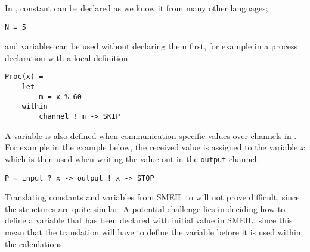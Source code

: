 In \cspm, constant can be declared as we know it from many other languages;
\begin{verbatim}
N = 5
\end{verbatim}
and variables can be used without declaring them first, for example in a process declaration with a local definition.
\begin{verbatim}
Proc(x) =
    let
        m = x % 60
    within
        channel ! m -> SKIP
\end{verbatim}
A variable is also defined when communication specific values over channels in \cspm. For example in the example below, the received value is assigned to the variable $x$ which is then used when writing the value out in the \texttt{output} channel.
\begin{verbatim}
P = input ? x -> output ! x -> STOP
\end{verbatim}

Translating constants and variables from SMEIL to \cspm will not prove difficult, since the structures are quite similar.
A potential challenge lies in deciding how to define a variable that has been declared with initial value in SMEIL, since this mean that the \cspm translation will have to define the variable before it is used within the calculations.\\




